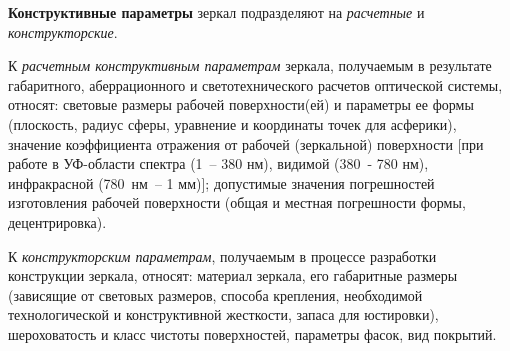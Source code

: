 \textbf{Конструктивные параметры} зеркал подразделяют на \textit{расчетные} и \textit{конструкторские}.

К \textit{расчетным конструктивным параметрам} зеркала, получаемым в результате габаритного, аберрационного и светотехнического расчетов оптической системы, относят: световые размеры рабочей поверхности(ей) и параметры ее формы (плоскость, радиус сферы, уравнение и координаты точек для асферики), значение коэффициента отражения от рабочей (зеркальной) поверхности [при работе в УФ-области спектра (1~-- 380 нм), видимой (380~- 780 нм), инфракрасной (780~нм~-- 1 мм)]; допустимые значения погрешностей изготовления рабочей поверхности (общая и местная погрешности формы, децентрировка).

К \textit{конструкторским параметрам}, получаемым в процессе разработки конструкции зеркала, относят: материал зеркала, его габаритные размеры (зависящие от световых размеров, способа крепления, необходимой технологической и конструктивной жесткости, запаса для юстировки), шероховатость и класс чистоты поверхностей, параметры фасок, вид покрытий.


